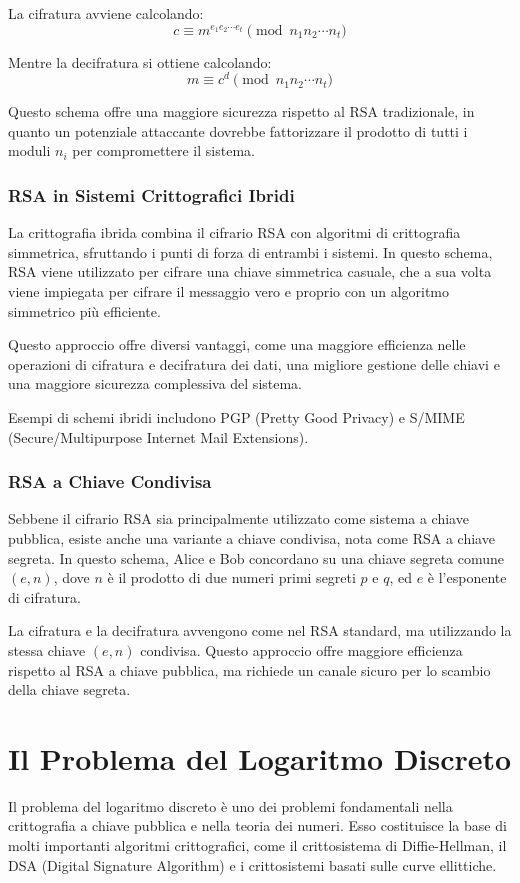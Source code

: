 \documentclass[a4paper,12pt]{report}
\begin{document}
La cifratura avviene calcolando:
\[c \equiv m^{e_1 e_2 \cdots e_t} \pmod{n_1 n_2 \cdots n_t}\]

Mentre la decifratura si ottiene calcolando:
\[m \equiv c^d \pmod{n_1 n_2 \cdots n_t}\]

Questo schema offre una maggiore sicurezza rispetto al RSA tradizionale, in quanto un potenziale attaccante dovrebbe fattorizzare il prodotto di tutti i moduli $n_i$ per compromettere il sistema.

\subsection{RSA in Sistemi Crittografici Ibridi}
La crittografia ibrida combina il cifrario RSA con algoritmi di crittografia simmetrica, sfruttando i punti di forza di entrambi i sistemi. In questo schema, RSA viene utilizzato per cifrare una chiave simmetrica casuale, che a sua volta viene impiegata per cifrare il messaggio vero e proprio con un algoritmo simmetrico più efficiente.

Questo approccio offre diversi vantaggi, come una maggiore efficienza nelle operazioni di cifratura e decifratura dei dati, una migliore gestione delle chiavi e una maggiore sicurezza complessiva del sistema. 

Esempi di schemi ibridi includono PGP (Pretty Good Privacy) e S/MIME (Secure/Multipurpose Internet Mail Extensions).

\subsection{RSA a Chiave Condivisa}
Sebbene il cifrario RSA sia principalmente utilizzato come sistema a chiave pubblica, esiste anche una variante a chiave condivisa, nota come RSA a chiave segreta. In questo schema, Alice e Bob concordano su una chiave segreta comune $(e, n)$, dove $n$ è il prodotto di due numeri primi segreti $p$ e $q$, ed $e$ è l'esponente di cifratura.

La cifratura e la decifratura avvengono come nel RSA standard, ma utilizzando la stessa chiave $(e, n)$ condivisa. Questo approccio offre maggiore efficienza rispetto al RSA a chiave pubblica, ma richiede un canale sicuro per lo scambio della chiave segreta.
%
%
%
%
%
%
%
%
%
%
%
%
%
%
%
%
%
\chapter{Il Problema del Logaritmo Discreto}
Il problema del logaritmo discreto è uno dei problemi fondamentali nella crittografia a chiave pubblica e nella teoria dei numeri. Esso costituisce la base di molti importanti algoritmi crittografici, come il crittosistema di Diffie-Hellman, il DSA (Digital Signature Algorithm) e i crittosistemi basati sulle curve ellittiche.
\end{document}
